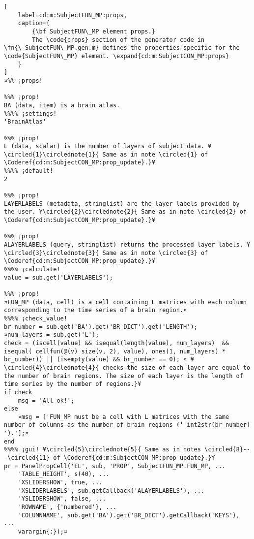 \documentclass{tufte-handout}
\begin{document}
\begin{lstlisting}[
	label=cd:m:SubjectFUN_MP:props,
	caption={
		{\bf SubjectFUN\_MP element props.}
		The \code{props} section of the generator code in \fn{\_SubjectFUN\_MP.gen.m} defines the properties specific for the \code{SubjectFUN\_MP} element. \expand{cd:m:SubjectCON_MP:props}
	}
]
¤%% ¡props!

%%% ¡prop!
BA (data, item) is a brain atlas.
%%%% ¡settings!
'BrainAtlas'

%%% ¡prop!
L (data, scalar) is the number of layers of subject data. ¥\circled{1}\circlednote{1}{ Same as in note \circled{1} of \Coderef{cd:m:SubjectCON_MP:prop_update}.}¥
%%%% ¡default!
2

%%% ¡prop!
LAYERLABELS (metadata, stringlist) are the layer labels provided by the user. ¥\circled{2}\circlednote{2}{ Same as in note \circled{2} of \Coderef{cd:m:SubjectCON_MP:prop_update}.}¥

%%% ¡prop!
ALAYERLABELS (query, stringlist) returns the processed layer labels. ¥\circled{3}\circlednote{3}{ Same as in note \circled{3} of \Coderef{cd:m:SubjectCON_MP:prop_update}.}¥
%%%% ¡calculate!
value = sub.get('LAYERLABELS');

%%% ¡prop!
¤FUN_MP (data, cell) is a cell containing L matrices with each column corresponding to the time series of a brain region.¤
%%%% ¡check_value!
br_number = sub.get('BA').get('BR_DICT').get('LENGTH');
¤num_layers = sub.get('L');
check = (iscell(value) && isequal(length(value), num_layers)  && isequal( cellfun(@(v) size(v, 2), value), ones(1, num_layers) * br_number)) || (isempty(value) && br_number == 0); ¤ ¥\circled{4}\circlednote{4}{ checks the size of each layer are equal to the number of brain regions. The size of each layer is the length of time series by the number of regions.}¥
if check
    msg = 'All ok!';
else   
    ¤msg = ['FUN_MP must be a cell with L matrices with the same number of columns as the number of brain regions (' int2str(br_number) ').'];¤
end
%%%% ¡gui! ¥\circled{5}\circlednote{5}{ Same as in notes \circled{8}---\circled{11} of \Coderef{cd:m:SubjectCON_MP:prop_update}.}¥
pr = PanelPropCell('EL', sub, 'PROP', SubjectFUN_MP.FUN_MP, ...
    'TABLE_HEIGHT', s(40), ...
    'XSLIDERSHOW', true, ...
    'XSLIDERLABELS', sub.getCallback('ALAYERLABELS'), ...
    'YSLIDERSHOW', false, ...
    'ROWNAME', {'numbered'}, ...
    'COLUMNNAME', sub.get('BA').get('BR_DICT').getCallback('KEYS'), ...
    varargin{:});¤
\end{lstlisting}
\end{document}
